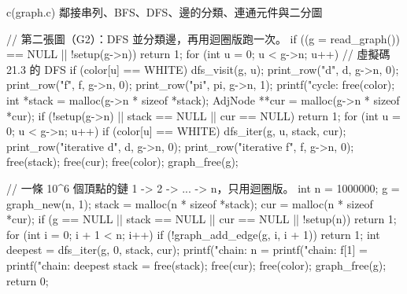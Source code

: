 \begin{example}[label=ex:gtr-graph]{c}{(graph.c) 鄰接串列、BFS、DFS、邊的分類、連通元件與二分圖}
{    // 第二張圖（G2）：DFS 並分類邊，再用迴圈版跑一次。
    if ((g = read_graph()) == NULL || !setup(g->n))
        return 1;
    for (int u = 0; u < g->n; u++)          // 虛擬碼 21.3 的 DFS
        if (color[u] == WHITE)
            dfs_visit(g, u);
    print_row("d", d, g->n, 0);
    print_row("f", f, g->n, 0);
    print_row("pi", pi, g->n, 1);
    printf("cycle: %
    free(color);
    int *stack = malloc(g->n * sizeof *stack);
    AdjNode **cur = malloc(g->n * sizeof *cur);
    if (!setup(g->n) || stack == NULL || cur == NULL)
        return 1;
    for (int u = 0; u < g->n; u++)
        if (color[u] == WHITE)
            dfs_iter(g, u, stack, cur);
    print_row("iterative d", d, g->n, 0);
    print_row("iterative f", f, g->n, 0);
    free(stack);
    free(cur);
    free(color);
    graph_free(g);

    // 一條 10^6 個頂點的鏈 1 -> 2 -> ... -> n，只用迴圈版。
    int n = 1000000;
    g = graph_new(n, 1);
    stack = malloc(n * sizeof *stack);
    cur = malloc(n * sizeof *cur);
    if (g == NULL || stack == NULL || cur == NULL || !setup(n))
        return 1;
    for (int i = 0; i + 1 < n; i++)
        if (!graph_add_edge(g, i, i + 1))
            return 1;
    int deepest = dfs_iter(g, 0, stack, cur);
    printf("chain: n = %
    printf("chain: f[1] = %
    printf("chain: deepest stack = %
    free(stack);
    free(cur);
    free(color);
    graph_free(g);
    return 0;
}
\end{example}
